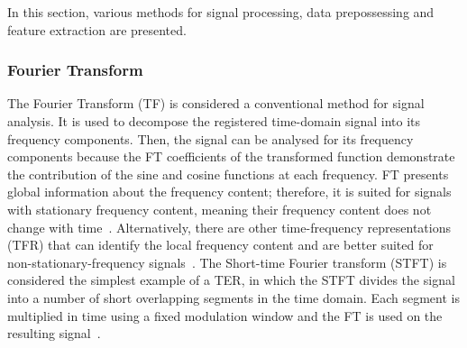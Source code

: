 In this section, various methods for signal processing, data prepossessing and feature extraction are presented.

\subsubsection{Fourier Transform} 
The Fourier Transform (TF) is considered a conventional method for signal analysis.
It is used to decompose the registered time-domain signal into its frequency components.
Then, the signal can be analysed for its frequency components because the FT coefficien\-ts of the transformed function demonstrate the contribution of the sine and cosine functions at each frequency.
FT presents global information about the frequency content; therefore, it is suited for signals with stationary frequency content, meaning their frequency content does not change with time~\cite{Raghavan2006}.
Alternatively, there are other time-frequency representations (TFR) that can identify the local frequency content and are better suited for non-stationary-frequency signals~\cite{Raghavan2006}.
The Short-time Fourier transform (STFT) is considered the simplest example of a TER, in which the STFT divides the signal into a number of short overlapping segments in the time domain.
Each segment is multiplied in time using a fixed modulation window and the FT is used on the resulting signal~\cite{Raghavan2006}.

